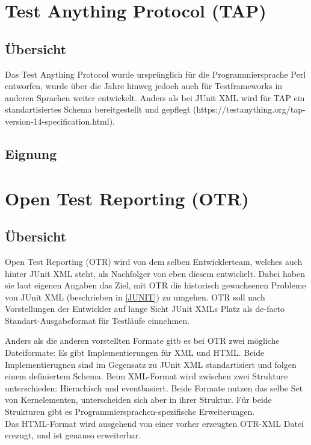 \section{Test Anything Protocol (TAP)}
\subsection{Übersicht}
Das Test Anything Protocol wurde ursprünglich für die Programmiersprache Perl entworfen, wurde über die Jahre hinweg jedoch auch für Testframeworks in anderen Sprachen weiter entwickelt. Anders als bei JUnit XML wird für TAP ein standartisiertes Schema bereitgestellt und gepflegt (https://testanything.org/tap-version-14-specification.html).

\subsection{Eignung}

\section{Open Test Reporting (OTR)}
\subsection{Übersicht}
Open Test Reporting (OTR) wird von dem selben Entwicklerteam, welches auch hinter JUnit XML steht, als Nachfolger von eben diesem entwickelt. Dabei haben sie laut eigenen Angaben das Ziel, mit OTR die historisch gewachsenen Probleme von JUnit XML (beschrieben in \ref{JUNIT}) zu umgehen. OTR soll nach Vorstellungen der Entwickler auf lange Sicht JUnit XMLs Platz als de-facto Standart-Ausgabeformat für Testläufe einnehmen.

Anders als die anderen vorstellten Formate gitb es bei OTR zwei mögliche Dateiformate: Es gibt Implementierungen für XML und HTML. Beide Implementierugnen sind im Gegensatz zu JUnit XML standartisiert und folgen einem definiertem Schema. Beim XML-Format wird zwischen zwei Strukture unterschieden: Hierachisch und eventbasiert. Beide Formate nutzen das selbe Set von Kernelementen, unterscheiden sich aber in ihrer Struktur. Für beide Strukturen gibt es Programmiersprachen-spezifische Erweiterungen.\\
Das HTML-Format wird ausgehend von einer vorher erzeugten OTR-XML Datei erezugt, und ist genauso erweiterbar. 


